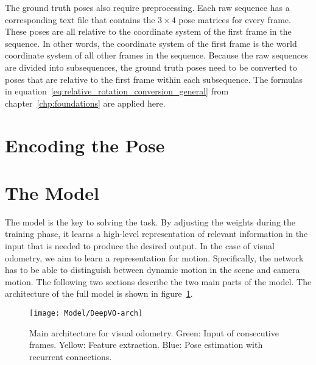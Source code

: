 			The ground truth poses also require preprocessing. 
			Each raw sequence has a corresponding text file that contains the $3 \times 4$ pose matrices for every frame.
			These poses are all relative to the coordinate system of the first frame in the sequence.
			In other words, the coordinate system of the first frame is the world coordinate system of all other frames in the sequence.
			Because the raw sequences are divided into subsequences, the ground truth poses need to be converted to poses that are relative to the first frame within each subsequence.
			The formulas in equation~\ref{eq:relative_rotation_conversion_general} from chapter~\ref{chp:foundations} are applied here.
			
			
	\section{Encoding the Pose}
	
	
	\section{The Model}
		The model is the key to solving the task.
		By adjusting the weights during the training phase, it learns a high-level representation of relevant information in the input that is needed to produce the desired output.
		In the case of visual odometry, we aim to learn a representation for motion.
		Specifically, the network has to be able to distinguish between dynamic motion in the scene and camera motion.
		The following two sections describe the two main parts of the model.
		The architecture of the full model is shown in figure~\ref{fig:main-architecture}.
		\begin{figure}[t]
			\centering
			\texttt{[image: Model/DeepVO-arch]}
			\caption[Main architecture for visual odometry]
					{Main architecture for visual odometry.
					 Green: Input of consecutive frames.
					 Yellow: Feature extraction.
					 Blue: Pose estimation with recurrent connections.
					 \label{fig:main-architecture}}
		\end{figure}
		
